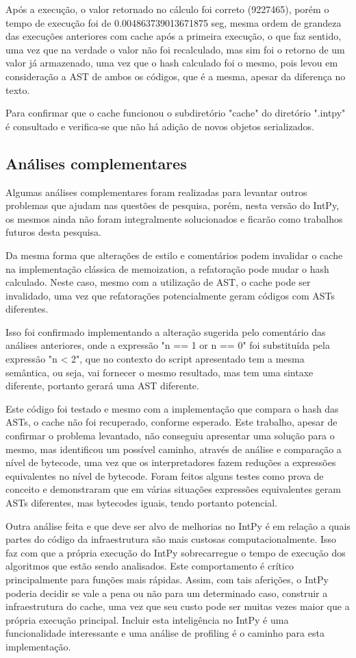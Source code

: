 \documentclass[sigconf]{acmart}
\begin{document}
Após a execução, o valor retornado no cálculo foi correto (9227465), porém o tempo de execução foi de 0.004863739013671875 seg, mesma ordem de grandeza das execuções anteriores com cache após a primeira execução, o que faz sentido, uma vez que na verdade o valor não foi recalculado, mas sim foi o retorno de um valor já armazenado, uma vez que o hash calculado foi o mesmo, pois levou em consideração a AST de ambos os códigos, que é a mesma, apesar da diferença no texto.

Para confirmar que o cache funcionou o subdiretório "cache" do diretório ".intpy" é consultado e verifica-se que não há adição de novos objetos serializados.

\subsection{Análises complementares}
Algumas análises complementares foram realizadas para levantar outros problemas que ajudam nas questões de pesquisa, porém, nesta versão do IntPy, os mesmos ainda não foram integralmente solucionados e ficarão como trabalhos futuros desta pesquisa.

Da mesma forma que alterações de estilo e comentários podem invalidar o cache na implementação clássica de memoization, a refatoração pode mudar o hash calculado. Neste caso, mesmo com a utilização de AST, o cache pode ser invalidado, uma vez que refatorações potencialmente geram códigos com ASTs diferentes.

Isso foi confirmado implementando a alteração sugerida pelo comentário das análises anteriores, onde a expressão "n == 1 or n == 0" foi substituída pela expressão "n < 2", que no contexto do script apresentado tem a mesma semântica, ou seja, vai fornecer o mesmo resultado, mas tem uma sintaxe diferente, portanto gerará uma AST diferente.

Este código foi testado e mesmo com a implementação que compara o hash das ASTs, o cache não foi recuperado, conforme esperado. Este trabalho, apesar de confirmar o problema levantado, não conseguiu apresentar uma solução para o mesmo, mas identificou um possível caminho, através de análise e comparação a nível de bytecode, uma vez que os interpretadores fazem reduções a expressões equivalentes no nível de bytecode. Foram feitos alguns testes como prova de conceito e demonstraram que em várias situações expressões equivalentes geram ASTs diferentes, mas bytecodes iguais, tendo portanto potencial.

Outra análise feita e que deve ser alvo de melhorias no IntPy é em relação a quais partes do código da infraestrutura são mais custosas computacionalmente. Isso faz com que a própria execução do IntPy sobrecarregue o tempo de execução dos algoritmos que estão sendo analisados. Este comportamento é crítico principalmente para funções mais rápidas. Assim, com tais aferições, o IntPy poderia decidir se vale a pena ou não para um determinado caso, construir a infraestrutura do cache, uma vez que seu custo pode ser muitas vezes maior que a própria execução principal. Incluir esta inteligência no IntPy é uma funcionalidade interessante e uma análise de profiling é o caminho para esta implementação.
\end{document}

